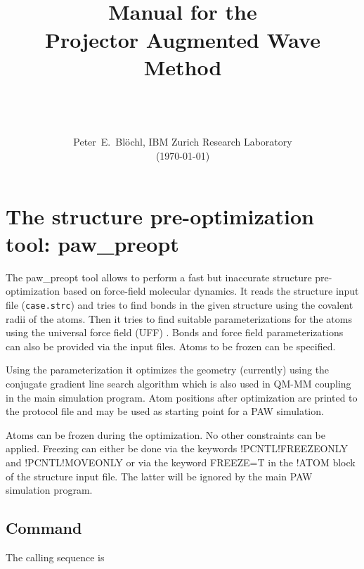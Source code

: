 \documentclass[final,12pt]{article}
\title{{\bfseries\Huge 
    \hrulefill\\
    \hrulefill Manual for the \hrulefill\\
    \hrulefill \hrulefill Projector Augmented Wave \hrulefill\\
    \hrulefill Method \hrulefill\\}
    \medskip{\LARGE Version 2.0}\\
\resizebox{!}{9.0cm}{\texttt{[image: Figs/big.eps]}}
}
\date{\hrulefill\\Peter~E.~Bl\"ochl, IBM Zurich Research Laboratory\\(\today)}
\begin{document}
          
%
\noindent            
\setcounter{page}{1}
\newpage
\tableofcontents

\newpage
\section{The structure pre-optimization tool: paw\_preopt}

The paw\_preopt tool allows to perform a fast but inaccurate
structure pre-optimization based on force-field molecular dynamics. It
reads the structure input file (\verb'case.strc') and tries to find
bonds in the given structure using the covalent radii of the
atoms. Then it tries to find suitable parameterizations for the atoms
using the universal force field (UFF) \cite{UFF}. Bonds and force
field parameterizations can also be provided via the input files. Atoms
to be frozen can be specified. 

Using the parameterization it optimizes the geometry (currently) using
the conjugate gradient line search algorithm which is also used in
QM-MM coupling in the main simulation program. Atom positions after
optimization are printed to the protocol file and may be used as
starting point for a PAW simulation.

Atoms can be frozen during the optimization. No other constraints can
be applied. Freezing can either be done via the keywords
!PCNTL!FREEZEONLY and !PCNTL!MOVEONLY or via the keyword FREEZE=T in
the !ATOM block of the structure input file. The latter will be
ignored by the main PAW simulation program.

\subsection{Command}

The calling sequence is
\end{document}
